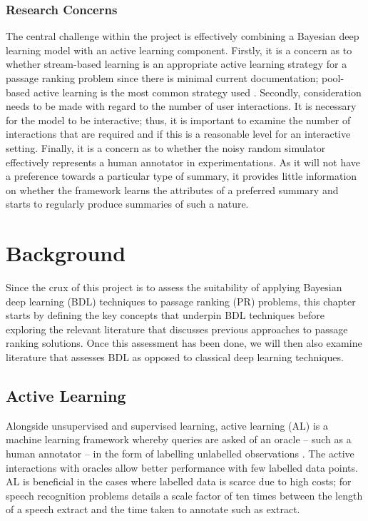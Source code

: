 \documentclass[ %
                    author={James Stephenson},
                supervisor={Dr. Edwin Simpson},
                    degree={MSc},
                     title={PROJECT PLAN},
                  subtitle={Bayesian Deep Learning For Extractive Test Summarisation},
                      type={},
                      year={2022}]{../additions/dissertation}
\begin{document}
			\subsection{Research Concerns}
			\label{chap:introduction:prop_approach:concerns}

				The central challenge within the project is effectively combining a Bayesian deep learning model with an active learning component. Firstly, it is a concern as to whether stream-based learning is an appropriate active learning strategy for a passage ranking problem since there is minimal current documentation; pool-based active learning is the most common strategy used \cite{Settles09}. Secondly, consideration needs to be made with regard to the number of user interactions. It is necessary for the model to be interactive; thus, it is important to examine the number of interactions that are required and if this is a reasonable level for an interactive setting. Finally, it is a concern as to whether the noisy random simulator effectively represents a human annotator in experimentations. As it will not have a preference towards a particular type of summary, it provides little information on whether the framework learns the attributes of a preferred summary and starts to regularly produce summaries of such a nature.
		
		

		
	
	\chapter{Background}
	\label{chap:literaturereview}
		
	Since the crux of this project is to assess the suitability of applying Bayesian deep learning (BDL) techniques to passage ranking (PR) problems, this chapter starts by defining the key concepts that underpin BDL techniques before exploring the relevant literature that discusses previous approaches to passage ranking solutions. Once this assessment has been done, we will then also examine literature that assesses BDL as opposed to classical deep learning techniques.
		
		
		\section{Active Learning}
		\label{chap:literaturereview:active}
		
		Alongside unsupervised and supervised learning, active learning (AL) is a machine learning framework whereby queries are asked of an oracle – such as a human annotator – in the form of labelling unlabelled observations \cite{Settles09}. The active interactions with oracles allow better performance with few labelled data points. AL is beneficial in the cases where labelled data is scarce due to high costs; for speech recognition problems \cite{Zhu05} details a scale factor of ten times between the length of a speech extract and the time taken to annotate such as extract.
		
\end{document}
